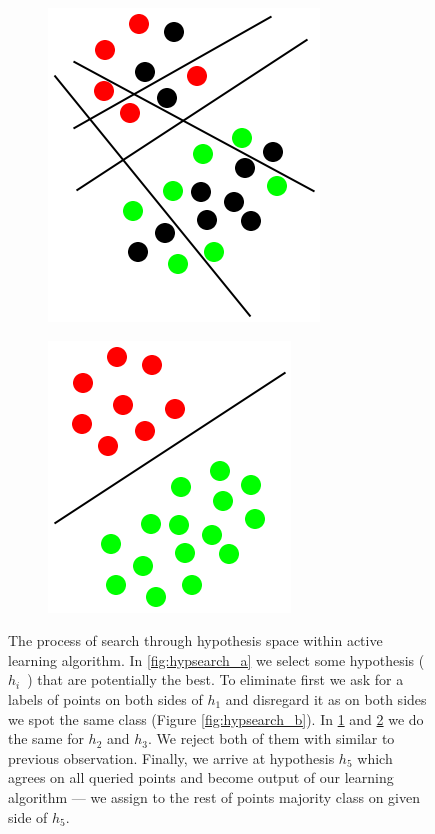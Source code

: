 \documentclass[12pt, a4paper, pdflatex]{report}
\begin{document}
\begin{figure}[htbp]
\begin{subfigure}[b]{0.3\textwidth}
    \caption{\label{fig:hypsearch_c}}
  \end{subfigure}
  \begin{subfigure}[b]{0.3\textwidth}
    \centering
    \includegraphics[width=0.5\linewidth]{graphics/hypsearch4.png}
    \caption{\label{fig:hypsearch_d}}
  \end{subfigure}
  \begin{subfigure}[b]{0.3\textwidth}
    \centering
    \includegraphics[width=0.5\linewidth]{graphics/hypsearch5.png}
    \caption{\label{fig:hypsearch_e}}
  \end{subfigure}
\begin{tiny}
\caption{The process of search through hypothesis space within active learning algorithm. In \ref{fig:hypsearch_a} we select some hypothesis (~$h_i$~) that are potentially the best. To eliminate first we ask for a labels of points on both sides of $h_1$ and disregard it as on both sides we spot the same class (Figure \ref{fig:hypsearch_b}). In \ref{fig:hypsearch_c} and \ref{fig:hypsearch_d} we do the same for $h_2$ and $h_3$. We reject both of them with similar to previous observation. Finally, we arrive at hypothesis $h_5$ which agrees on all queried points and become output of our learning algorithm --- we assign to the rest of points majority class on given side of $h_5$.\label{fig:hypsearch}}
\end{tiny}
\vspace{1cm}
\end{figure}
\end{document}

